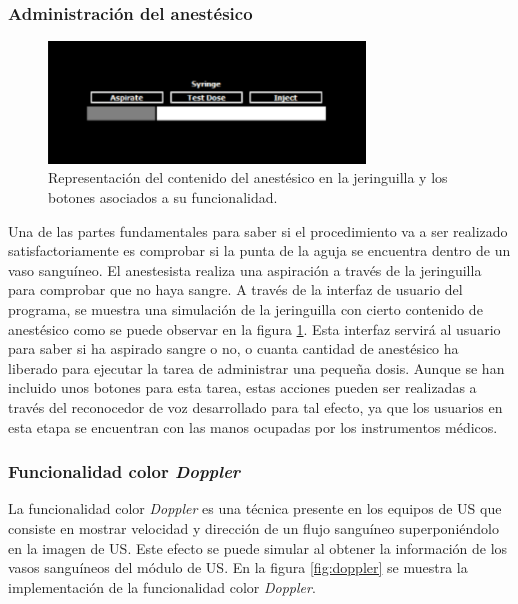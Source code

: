  
 
 
\subsubsection{Administración del anestésico}
 \begin{figure}[ht]
    \centering
    \includegraphics[width=0.75\textwidth]{IMG/Syringe.PNG}
    \caption{ Representación del contenido del anestésico en la jeringuilla y los botones asociados a su funcionalidad.}
    \label{fig:anest}
\end{figure}

Una de las partes fundamentales para saber si el procedimiento va a ser realizado satisfactoriamente es comprobar si la punta de la aguja se encuentra dentro de un vaso sanguíneo. El anestesista realiza una aspiración a través de la jeringuilla para comprobar que no haya sangre. A través de la interfaz de usuario del programa, se muestra una simulación de la jeringuilla con cierto contenido de anestésico como se puede observar en la figura \ref{fig:anest}. Esta interfaz servirá al usuario para saber si ha aspirado sangre o no, o cuanta cantidad de anestésico ha liberado para ejecutar la tarea de administrar una pequeña dosis. Aunque se han incluido unos botones para esta tarea, estas acciones pueden ser realizadas a través del reconocedor de voz desarrollado para tal efecto, ya que los usuarios en esta etapa se encuentran con las manos ocupadas por los instrumentos médicos.




\subsubsection{Funcionalidad color \emph{Doppler}}
\label{doppler}
La funcionalidad color \emph{Doppler} es una técnica presente en los equipos de \ac{US} que consiste en mostrar velocidad y dirección de un flujo sanguíneo superponiéndolo en la imagen de \ac{US}. Este efecto se puede simular al obtener la información de los vasos sanguíneos del módulo de \ac{US}.
En la figura \ref{fig:doppler} se muestra la implementación de la funcionalidad color \emph{Doppler}.

